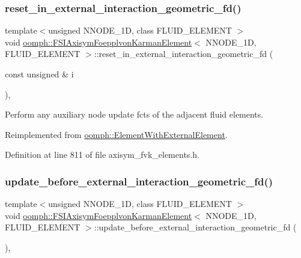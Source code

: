 \subsubsection{\texorpdfstring{reset\+\_\+in\+\_\+external\+\_\+interaction\+\_\+geometric\+\_\+fd()}{reset\_in\_external\_interaction\_geometric\_fd()}}
{\footnotesize\ttfamily template$<$unsigned N\+N\+O\+D\+E\+\_\+1D, class F\+L\+U\+I\+D\+\_\+\+E\+L\+E\+M\+E\+NT $>$ \\
void \hyperlink{classoomph_1_1FSIAxisymFoepplvonKarmanElement}{oomph\+::\+F\+S\+I\+Axisym\+Foepplvon\+Karman\+Element}$<$ N\+N\+O\+D\+E\+\_\+1D, F\+L\+U\+I\+D\+\_\+\+E\+L\+E\+M\+E\+NT $>$\+::reset\+\_\+in\+\_\+external\+\_\+interaction\+\_\+geometric\+\_\+fd (\begin{DoxyParamCaption}\item[{const unsigned \&}]{i }\end{DoxyParamCaption})\hspace{0.3cm}{\ttfamily [inline]}, {\ttfamily [virtual]}}



Perform any auxiliary node update fcts of the adjacent fluid elements. 



Reimplemented from \hyperlink{classoomph_1_1ElementWithExternalElement_a2bc7a069b01795d9c8036fb81e8b319d}{oomph\+::\+Element\+With\+External\+Element}.



Definition at line 811 of file axisym\+\_\+fvk\+\_\+elements.\+h.

\mbox{\label{classoomph_1_1FSIAxisymFoepplvonKarmanElement_a4ab5ac225a4ecbd709e8bb5ce752f939}} 
\subsubsection{\texorpdfstring{update\+\_\+before\+\_\+external\+\_\+interaction\+\_\+geometric\+\_\+fd()}{update\_before\_external\_interaction\_geometric\_fd()}}
{\footnotesize\ttfamily template$<$unsigned N\+N\+O\+D\+E\+\_\+1D, class F\+L\+U\+I\+D\+\_\+\+E\+L\+E\+M\+E\+NT $>$ \\
void \hyperlink{classoomph_1_1FSIAxisymFoepplvonKarmanElement}{oomph\+::\+F\+S\+I\+Axisym\+Foepplvon\+Karman\+Element}$<$ N\+N\+O\+D\+E\+\_\+1D, F\+L\+U\+I\+D\+\_\+\+E\+L\+E\+M\+E\+NT $>$\+::update\+\_\+before\+\_\+external\+\_\+interaction\+\_\+geometric\+\_\+fd (\begin{DoxyParamCaption}{ }\end{DoxyParamCaption})\hspace{0.3cm}{\ttfamily [inline]}, {\ttfamily [virtual]}}



